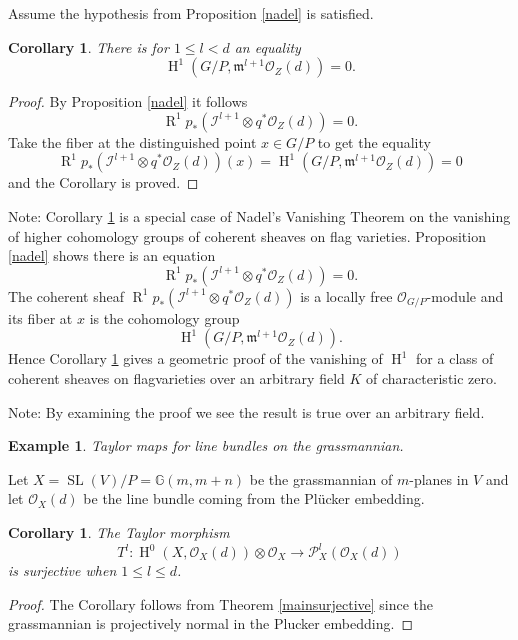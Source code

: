 \documentclass{amsart}
\theoremstyle{plain}
\newtheorem{corollary}[theorem]{Corollary}
\newtheorem{example}[theorem]{Example}
\theoremstyle{definition}
\theoremstyle{remark}
\numberwithin{equation}{theorem}
\begin{document}
Assume the hypothesis from Proposition \ref{nadel} is satisfied.

\begin{corollary} \label{nadelvanishing} There is for $1\leq l <d$ an equality
\[ {\operatorname{H} }^1(G/P,{\mathfrak{m}}^{l+1}{\mathcal{O} }_Z(d))=0.\]
\end{corollary}
\begin{proof} By Proposition \ref{nadel} it follows
\[ {\operatorname{R} }^1p_*({\mathcal{I}}^{l+1}\otimes q^*{\mathcal{O} }_Z(d))=0.\]
Take the fiber at the distinguished point $x\in G/P$ to get the
equality
\[ {\operatorname{R} }^1p_*({\mathcal{I}}^{l+1}\otimes
q^*{\mathcal{O} }_Z(d))(x)={\operatorname{H} }^1(G/P,{\mathfrak{m}}^{l+1}{\mathcal{O} }_Z(d))=0\]
and the Corollary is proved.
\end{proof}

Note: Corollary \ref{nadelvanishing} is a special case of Nadel's Vanishing
Theorem on the vanishing of higher cohomology groups of coherent
sheaves on flag varieties. Proposition \ref{nadel} shows there is an
equation
\[ {\operatorname{R} }^1p_*({\mathcal{I}}^{l+1}\otimes q^*{\mathcal{O} }_Z(d))=0.\]
The coherent sheaf ${\operatorname{R} }^1p_*({\mathcal{I}}^{l+1}\otimes q^*{\mathcal{O} }_Z(d))$ is a locally
free ${\mathcal{O} }_{G/P}$-module and its fiber at $x$ is the cohomology group
\[ {\operatorname{H} }^1(G/P,{\mathfrak{m}}^{l+1}{\mathcal{O} }_Z(d)).\]
Hence Corollary \ref{nadelvanishing} gives a geometric proof of the
vanishing of ${\operatorname{H} }^1$ for a class of coherent sheaves on flagvarieties
over an arbitrary field $K$ of characteristic zero.

Note: By examining the proof we see the result is true over an
arbitrary field.

\begin{example} Taylor maps for line bundles on the grassmannian.\end{example}

Let $X={\operatorname{SL}}(V)/P={\mathbb{G} }(m,m+n)$ be the grassmannian of $m$-planes in $V$
and let ${\mathcal{O} }_X(d)$ be the line bundle coming from the Pl\"{u}cker
embedding.

\begin{corollary} \label{surjective} The Taylor morphism
\[ T^l:{\operatorname{H} }^0(X,{\mathcal{O} }_X(d))\otimes {\mathcal{O} }_X \rightarrow {\mathcal{P} }^l_X({\mathcal{O} }_X(d)) \]
is surjective when $1\leq l \leq d$.
\end{corollary}
\begin{proof} The Corollary follows from Theorem \ref{mainsurjective}
since the grassmannian is projectively normal in
the Plucker embedding. 
\end{proof}
\end{document}
